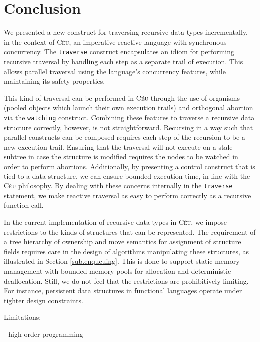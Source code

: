 \documentclass{sig-alternate}
\newcommand{\CEU}{\textsc{C\'{e}u}\xspace}
\newcommand{\code}[1] {{\small{\texttt{#1}}}}
\begin{document}
\section{Conclusion}

We presented a new construct for traversing recursive data types
incrementally, in the context of \CEU, an imperative reactive language with
synchronous concurrency. The \code{traverse} construct encapsulates an idiom
for performing recursive traversal by handling each step as a separate trail
of execution. This allows parallel traversal using the language's concurrency
features, while maintaining its safety properties.

This kind of traversal can be performed in \CEU through the use of organisms
(pooled objects which launch their own execution trails) and orthogonal
abortion via the \code{watching} construct. Combining these features to
traverse a recursive data structure correctly, however, is not straightforward.
Recursing in a way such that parallel constructs can be composed requires each
step of the recursion to be a new execution trail. Ensuring that the traversal
will not execute on a stale subtree in case the structure is modified requires
the nodes to be watched in order to perform abortions. Additionally, by
presenting a control construct that is tied to a data structure, we can ensure
bounded execution time, in line with the \CEU philosophy. By dealing with these
concerns internally in the \code{traverse} statement, we make reactive
traversal as easy to perform correctly as a recursive function call.

In the current implementation of recursive data types in \CEU, we impose
restrictions to the kinds of structures that can be represented. The
requirement of a tree hierarchy of ownership and move semantics for assignment
of structure fields requires care in the design of algorithms
manipulating these structures, as illustrated in Section \ref{sub.enqueuing}.
This is done to support static memory management with bounded memory pools for
allocation and deterministic deallocation. Still, we do not feel that the
restrictions are prohibitively limiting. For instance, persistent data
structures in functional languages \cite{TODO} operate under tighter design constraints.

Limitations:

- high-order programming



\balancecolumns
\end{document}
